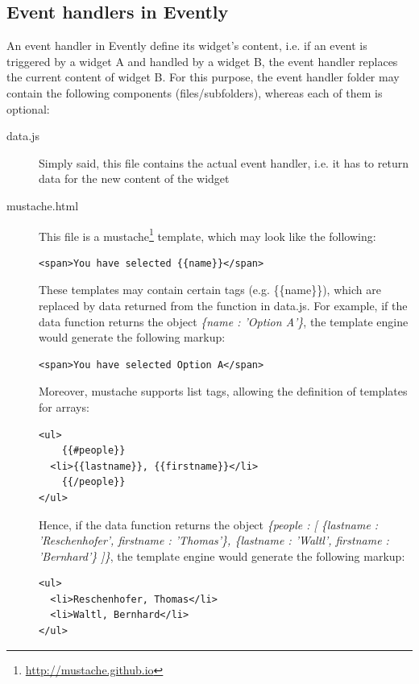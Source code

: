 \subsection{Event handlers in Evently}
\label{couchapp:evently:eventhandlers}
An event handler in Evently define its widget's content, i.e. if an event is triggered by a widget A and handled by a widget B, the event handler replaces the current content of widget B. For this purpose, the event handler folder may contain the following components (files/subfolders), whereas each of them is optional:
\begin{description}
\item[data.js] Simply said, this file contains the actual event handler, i.e. it has to return data for the new content of the widget
\item[mustache.html] This file is a mustache\footnote{\url{http://mustache.github.io}} template, which may look like the following:
\begin{lstlisting}
<span>You have selected {{name}}</span>
\end{lstlisting}
These templates may contain certain tags (e.g. \{\{name\}\}), which are replaced by data returned from the function in data.js. For example, if the data function returns the object \emph{\{name : 'Option A'\}}, the template engine would generate the following markup:
\begin{lstlisting}
<span>You have selected Option A</span>
\end{lstlisting}
Moreover, mustache supports list tags, allowing the definition of templates for arrays:
\begin{lstlisting}
<ul>
    {{#people}}
  <li>{{lastname}}, {{firstname}}</li>
    {{/people}}
</ul>
\end{lstlisting}
Hence, if the data function returns the object \emph{\{people : [ \{lastname : 'Reschenhofer', firstname : 'Thomas'\}, \{lastname : 'Waltl', firstname : 'Bernhard'\} ]\}}, the template engine would generate the following markup:
\begin{lstlisting}
<ul>
  <li>Reschenhofer, Thomas</li>
  <li>Waltl, Bernhard</li>
</ul>
\end{lstlisting}


\end{description}
